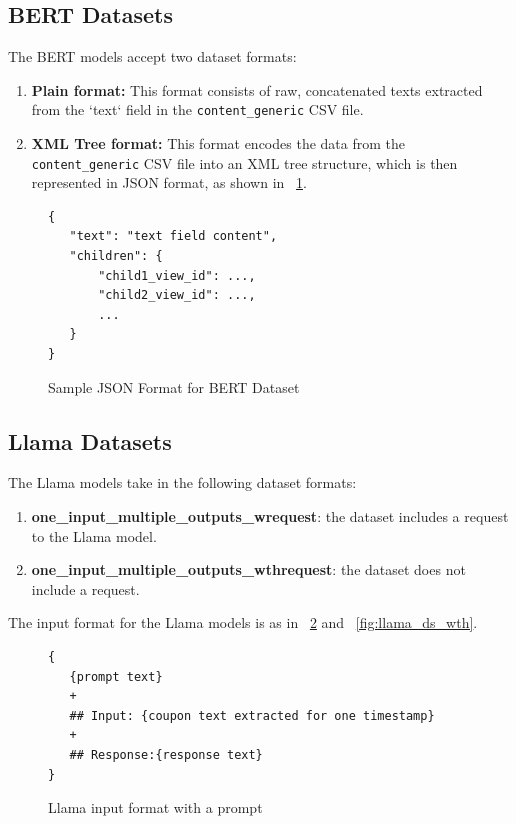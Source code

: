 \documentclass[licencjacka,en]{pracamgr}
\begin{document}
\subsection{BERT Datasets}
The BERT models accept two dataset formats:

\begin{enumerate}
    \item \textbf{Plain format:} This format consists of raw, concatenated texts extracted from the `text` field in the \texttt{content\_generic} CSV file.
    \item \textbf{XML Tree format:} This format encodes the data from the \texttt{content\_generic} CSV file into an XML tree structure, which is then represented in JSON format, as shown in ~\ref{fig:json_example_xml_tree}.
\end{enumerate}



\begin{figure}[h]
\centering
\begin{tcolorbox}[sharp corners, boxrule=0.5mm, colframe=black, colback=white, coltitle=black, width=0.9\textwidth] 
\begin{BVerbatim}
{
   "text": "text field content",
   "children": {
       "child1_view_id": ...,
       "child2_view_id": ...,
       ...
   }
}
\end{BVerbatim}
\end{tcolorbox}
\caption{Sample JSON Format for BERT Dataset}
\label{fig:json_example_xml_tree}
\end{figure}

\subsection{Llama Datasets}
The Llama models take in the following dataset formats:

\begin{enumerate}
    \item \textbf{one\_input\_multiple\_outputs\_wrequest}: the dataset includes a request to the Llama model.
    \item \textbf{one\_input\_multiple\_outputs\_wthrequest}: the dataset does not include a request.
\end{enumerate}

The input format for the Llama models is as in ~\ref{fig:llama_ds_w} and ~\ref{fig:llama_ds_wth}.

\begin{figure}[h]
\centering
\begin{tcolorbox}[sharp corners, boxrule=0.5mm, colframe=black, colback=white, coltitle=black, width=0.9\textwidth] 
\begin{BVerbatim}
{
   {prompt text}
   +
   ## Input: {coupon text extracted for one timestamp}
   +
   ## Response:{response text}
}
\end{BVerbatim}
\end{tcolorbox}
\caption{Llama input format with a prompt}
\label{fig:llama_ds_w}
\end{figure}
\end{document}
